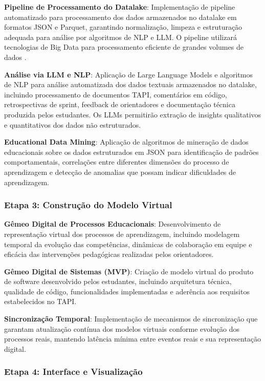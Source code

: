 \documentclass[12pt,a4paper]{article}
\begin{document}
\textbf{Pipeline de Processamento do Datalake}: Implementação de pipeline automatizado para processamento dos dados armazenados no datalake em formatos JSON e Parquet, garantindo normalização, limpeza e estruturação adequada para análise por algoritmos de NLP e LLM. O pipeline utilizará tecnologias de Big Data para processamento eficiente de grandes volumes de dados \cite{romero2020}.

\textbf{Análise via LLM e NLP}: Aplicação de Large Language Models e algoritmos de NLP para análise automatizada dos dados textuais armazenados no datalake, incluindo processamento de documentos TAPI, comentários em código, retrospectivas de sprint, feedback de orientadores e documentação técnica produzida pelos estudantes. Os LLMs permitirão extração de insights qualitativos e quantitativos dos dados não estruturados.

\textbf{Educational Data Mining}: Aplicação de algoritmos de mineração de dados educacionais \cite{romero2010} sobre os dados estruturados em JSON para identificação de padrões comportamentais, correlações entre diferentes dimensões do processo de aprendizagem e detecção de anomalias que possam indicar dificuldades de aprendizagem.

\subsubsection{Etapa 3: Construção do Modelo Virtual}

\textbf{Gêmeo Digital de Processos Educacionais}: Desenvolvimento de representação virtual dos processos de aprendizagem, incluindo modelagem temporal da evolução das competências, dinâmicas de colaboração em equipe e eficácia das intervenções pedagógicas realizadas pelos orientadores.

\textbf{Gêmeo Digital de Sistemas (MVP)}: Criação de modelo virtual do produto de software desenvolvido pelos estudantes, incluindo arquitetura técnica, qualidade de código, funcionalidades implementadas e aderência aos requisitos estabelecidos no TAPI.

\textbf{Sincronização Temporal}: Implementação de mecanismos de sincronização que garantam atualização contínua dos modelos virtuais conforme evolução dos processos reais, mantendo latência mínima entre eventos reais e sua representação digital.

\subsubsection{Etapa 4: Interface e Visualização}
\end{document}
